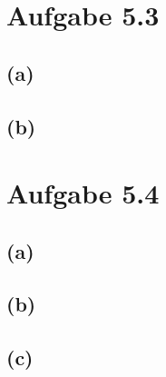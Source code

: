 \documentclass[12pt]{article}
\begin{document}
\section{Aufgabe 5.3}
\subsection{(a)}
\subsection{(b)}

\section{Aufgabe 5.4}
\subsection{(a)}
\subsection{(b)}
\subsection{(c)}

\begin{align}
\end{align}
\end{document}
